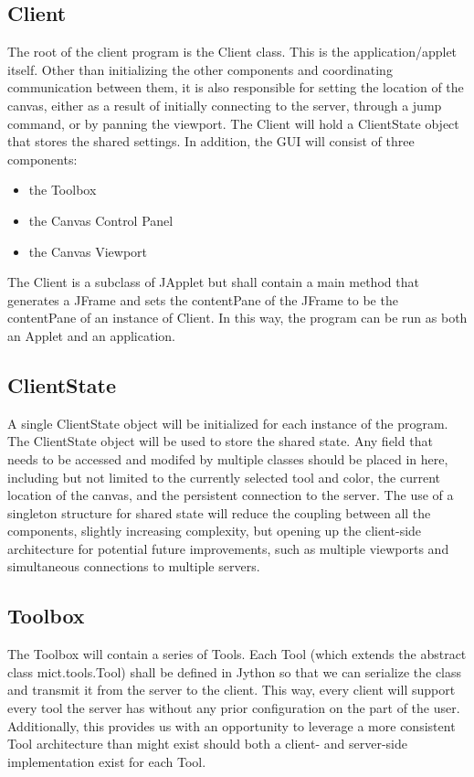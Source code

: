 \documentclass[11pt,oneside,a4paper]{article}
\begin{document}
 \subsection{Client}
  The root of the client program is the Client class. This is the
  application/applet itself. Other than initializing the other components and
  coordinating communication between them, it is also responsible for setting the
  location of the canvas, either as a result of initially connecting to the
  server, through a jump command, or by panning the viewport. The Client will
  hold a ClientState object that stores the shared settings. In addition, the GUI
  will consist of three components:
  \begin{itemize}
   \item the Toolbox
   \item the Canvas Control Panel
   \item the Canvas Viewport
  \end{itemize}
 The Client is a subclass of JApplet but shall contain a main method that
 generates a JFrame and sets the contentPane of the JFrame to be the
 contentPane of an instance of Client. In this way, the program can be run as
 both an Applet and an application. 
 \subsection{ClientState}
  A single ClientState object will be initialized for each instance of the
  program. The ClientState object will be used to store the shared state. Any
  field that needs to be accessed and modifed by multiple classes should be
  placed in here, including but not limited to the currently selected tool and
  color, the current location of the canvas, and the persistent connection to the
  server. The use of a singleton structure for shared state will reduce the
  coupling between all the components, slightly increasing complexity, but
  opening up the client-side architecture for potential future improvements, such
  as multiple viewports and simultaneous connections to multiple servers.

 \subsection{Toolbox}
  The Toolbox will contain a series of Tools. Each Tool (which extends the
  abstract class mict.tools.Tool) shall be defined in Jython so that we can
  serialize the class and transmit it from the server to the client. This way,
  every client will support every tool the server has without any prior
  configuration on the part of the user. Additionally, this provides us with an
  opportunity to leverage a more consistent Tool architecture than might exist
  should both a client- and server-side implementation exist for each Tool.
\end{document}
